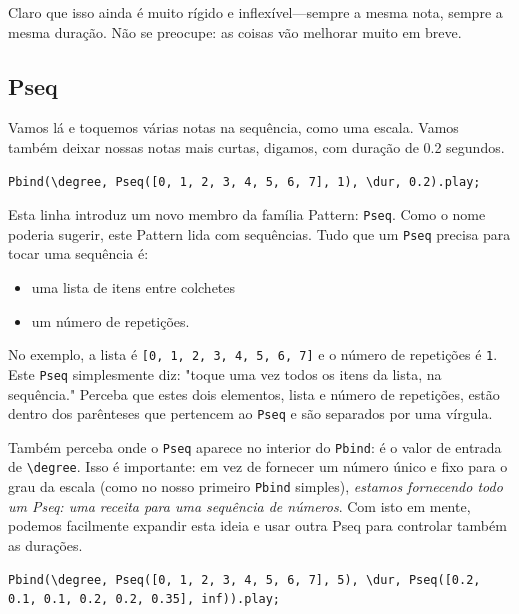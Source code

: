 Claro que isso ainda é muito rígido e inflexível---sempre a mesma nota, sempre a mesma duração. Não se preocupe: as coisas vão melhorar muito em breve.
\subsection{Pseq}

Vamos lá e toquemos várias notas na sequência, como uma escala. Vamos também deixar nossas notas mais curtas, digamos, com duração de 0.2 segundos.
 
\begin{lstlisting}[style=SuperCollider-IDE, basicstyle=\scttfamily\footnotesize]
Pbind(\degree, Pseq([0, 1, 2, 3, 4, 5, 6, 7], 1), \dur, 0.2).play;
\end{lstlisting}

Esta linha introduz um novo membro da família Pattern: \texttt{Pseq}. Como o nome poderia sugerir, este Pattern lida com sequências. Tudo que um \texttt{Pseq} precisa para tocar uma sequência é:
\begin{itemize}
\item uma lista de itens entre colchetes
\item um número de repetições.
\end{itemize} 

No exemplo, a lista é \texttt{[0, 1, 2, 3, 4, 5, 6, 7]} e o número de repetições é \texttt{1}. Este \texttt{Pseq} simplesmente diz: "toque uma vez todos os itens da lista, na sequência." Perceba que estes dois elementos, lista e número de repetições, estão dentro dos parênteses que pertencem ao \texttt{Pseq} e são separados por uma vírgula.

Também perceba onde o \texttt{Pseq} aparece no interior do \texttt{Pbind}: é o valor de entrada de \texttt{\textbackslash degree}. Isso é importante: em vez de fornecer um número único e fixo para o grau da escala (como no nosso primeiro \texttt{Pbind} simples), \emph{estamos fornecendo todo um Pseq: uma receita para uma sequência de números}. Com isto em mente, podemos facilmente expandir esta ideia e usar outra Pseq para controlar também as durações.
 
\begin{lstlisting}[style=SuperCollider-IDE, basicstyle=\scttfamily\footnotesize]
Pbind(\degree, Pseq([0, 1, 2, 3, 4, 5, 6, 7], 5), \dur, Pseq([0.2, 0.1, 0.1, 0.2, 0.2, 0.35], inf)).play;
\end{lstlisting}
 
